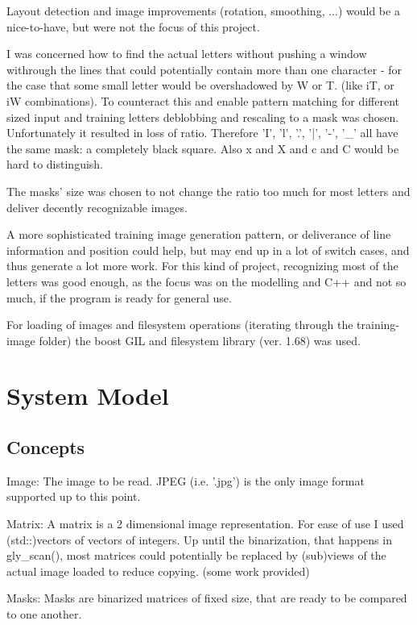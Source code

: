 Layout detection and image improvements (rotation, smoothing, ...) would be a nice-to-have, but were not the focus of this project.

I was concerned how to find the actual letters without pushing a window withrough the lines that could potentially contain more than one character - for the case that some small letter would be overshadowed by W or T. (like iT, or iW combinations). To counteract this and enable pattern matching for different sized input and training letters deblobbing and rescaling to a mask was chosen. Unfortunately it resulted in loss of ratio. Therefore 'I', 'l', '.', '|', '-', '_' all have the same mask: a completely black square. Also x and X and c and C would be hard to distinguish.\newline

The masks' size was chosen to not change the ratio too much for most letters and deliver decently recognizable images. 

A more sophisticated training image generation pattern, or deliverance of line information and position could help, but may end up in a lot of switch cases, and thus generate a lot more work. For this kind of project, recognizing most of the letters was good enough, as the focus was on the modelling and C++ and not so much, if the program is ready for general use.

For loading of images and filesystem operations (iterating through the training-image folder) the boost GIL and filesystem library (ver. 1.68) was used.


\section {System Model}
  \subsection{Concepts}

Image: The image to be read. JPEG (i.e. '.jpg') is the only image format supported up to this point.\newline

Matrix: A matrix is a 2 dimensional image representation. For ease of use I used (std::)vectors of vectors of integers. Up until the binarization, that happens in gly_scan(), most matrices could potentially be replaced by (sub)views of the actual image loaded to reduce copying. (some work provided)\newline

Masks: Masks are binarized matrices of fixed size, that are ready to be compared to one another.\newline

